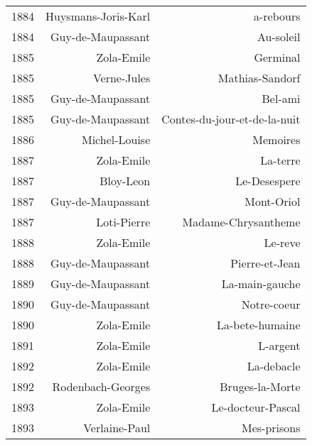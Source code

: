\begin{xltabular}{\textwidth}{lrr}
1884 &                  Huysmans-Joris-Karl &                             a-rebours \\
1884 &                    Guy-de-Maupassant &                             Au-soleil \\
1885 &                           Zola-Emile &                              Germinal \\
1885 &                          Verne-Jules &                       Mathias-Sandorf \\
1885 &                    Guy-de-Maupassant &                               Bel-ami \\
1885 &                    Guy-de-Maupassant &          Contes-du-jour-et-de-la-nuit \\
1886 &                        Michel-Louise &                              Memoires \\
1887 &                           Zola-Emile &                              La-terre \\
1887 &                            Bloy-Leon &                          Le-Desespere \\
1887 &                    Guy-de-Maupassant &                            Mont-Oriol \\
1887 &                          Loti-Pierre &                   Madame-Chrysantheme \\
1888 &                           Zola-Emile &                               Le-reve \\
1888 &                    Guy-de-Maupassant &                        Pierre-et-Jean \\
1889 &                    Guy-de-Maupassant &                        La-main-gauche \\
1890 &                    Guy-de-Maupassant &                           Notre-coeur \\
1890 &                           Zola-Emile &                       La-bete-humaine \\
1891 &                           Zola-Emile &                              L-argent \\
1892 &                           Zola-Emile &                            La-debacle \\
1892 &                    Rodenbach-Georges &                       Bruges-la-Morte \\
1893 &                           Zola-Emile &                     Le-docteur-Pascal \\
1893 &                        Verlaine-Paul &                           Mes-prisons \\

\end{xltabular}
